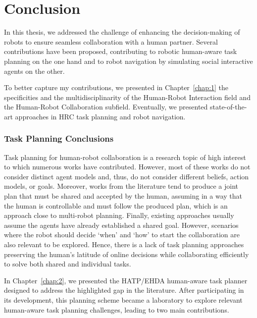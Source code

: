 \chapter*{Conclusion}



In this thesis, we addressed the challenge of enhancing the decision-making of robots to ensure seamless collaboration with a human partner. Several contributions have been proposed, contributing to robotic human-aware task planning on the one hand and to robot navigation by simulating social interactive agents on the other. 

To better capture my contributions, we presented in Chapter~\ref{chap:1} the specificities and the multidisciplinarity of the Human-Robot Interaction field and the Human-Robot Collaboration subfield. Eventually, we presented state-of-the-art approaches in HRC task planning and robot navigation. 

\subsection*{Task Planning Conclusions}

Task planning for human-robot collaboration is a research topic of high interest to which numerous works have contributed. However, most of these works do not consider distinct agent models and, thus, do not consider different beliefs, action models, or goals. Moreover, works from the literature tend to produce a joint plan that must be shared and accepted by the human, assuming in a way that the human is controllable and must follow the produced plan, which is an approach close to multi-robot planning. Finally, existing approaches usually assume the agents have already established a shared goal. However, scenarios where the robot should decide `when' and `how' to start the collaboration are also relevant to be explored. 
Hence, there is a lack of task planning approaches preserving the human's latitude of online decisions while collaborating efficiently to solve both shared and individual tasks. 



In Chapter~\ref{chap:2}, we presented the HATP/EHDA human-aware task planner designed to address the highlighted gap in the literature. After participating in its development, this planning scheme became a laboratory to explore relevant human-aware task planning challenges, leading to two main contributions. 

